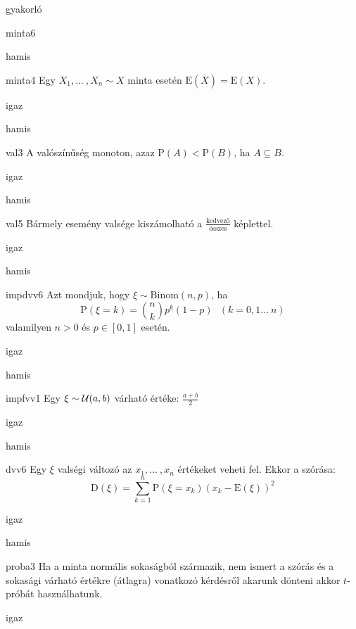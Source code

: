 \documentclass[12pt]{article}
\begin{document}
\begin{quiz}{gyakorló}
\begin{multi}[feedback={Definíció.}]{minta6}
\item hamis
\end{multi}
\begin{multi}[feedback={A mintaátlag torzítatlan becslése a sokasági (elméleti) várható értéknek (átlagnak)}]{minta4}
Egy $X_1,{...\:},X_n\sim X$ minta esetén $\mathrm{E}(\overline{X})=\mathrm{E}(X)$.
\item* igaz
\item hamis
\end{multi}
\begin{multi}[feedback={$A=B$?}]{val3}
A valószínűség monoton, azaz $\mathrm{P}(A)<\mathrm{P}(B)$, ha $A\subseteq B$.
\item igaz
\item* hamis
\end{multi}
\begin{multi}[feedback={Csak ha az elemi események egyforma valségűek.}]{val5}
Bármely esemény valsége kiszámolható a $\frac{\text{kedvező}}{\text{összes}}$ képlettel.
\item igaz
\item* hamis
\end{multi}
\begin{multi}[feedback={Def.}]{impdvv6}
Azt mondjuk, hogy $\xi\sim \mathrm{Binom}(n,p)$, ha 
$$
\mathrm{P}(\xi=k)=\binom{n}{k}p^k(1-p)\ \ \ (k=0,1{...\:} n)
$$
valamilyen $n>0$ és $p\in[0,1]$ esetén.
\item igaz
\item* hamis
\end{multi}
\begin{multi}[feedback={wiki}]{impfvv1}
Egy $\xi\sim {\cal U}(a,b)$ várható értéke: $\frac{a+b}{2}$
\item* igaz
\item hamis
\end{multi}
\begin{multi}[feedback={Def.}]{dvv6}
Egy $\xi$ valségi változó az $x_1,{...\:}, x_n$ értékeket veheti fel. Ekkor a szórása:
$$
\mathrm{D}(\xi)=\sum_{k=1}^n \mathrm{P}(\xi=x_k)(x_k-\mathrm{E}(\xi))^2
$$
\item igaz
\item* hamis
\end{multi}
\begin{multi}[feedback={Ezek az $t$-próba használatának előzményei.}]{proba3}
Ha a minta normális sokaságból származik, nem ismert a szórás és a sokasági várható értékre (átlagra) vonatkozó kérdésről 
akarunk dönteni akkor $t$-próbát használhatunk.
\item* igaz

\end{multi}
\end{quiz}
\end{document}
